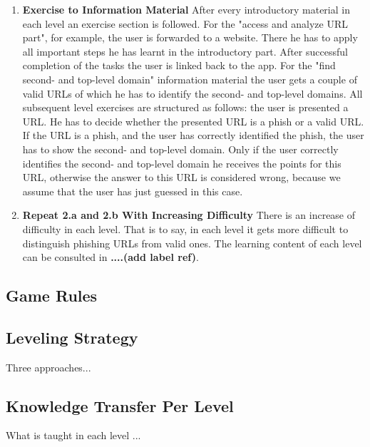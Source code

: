 \begin{enumerate}
\begin{enumerate}
		\item \textbf{Exercise to Information Material} After every introductory material in each level an exercise section is followed. For the "access and analyze URL part", for example, the user is forwarded to a website. There he has to apply all important steps he has learnt in the introductory part. After successful completion of the tasks the user is linked back to the app. For the "find second- and top-level domain" information material the user gets a couple of valid URLs of which he has to identify the second- and top-level domains. All subsequent level exercises are structured as follows: the user is presented a URL. He has to decide whether the presented URL is a phish or a valid URL. If the URL is a phish, and the user has correctly identified the phish, the user has to show the second- and top-level domain. Only if the user correctly identifies the second- and top-level domain he receives the points for this URL, otherwise the answer to this URL is considered wrong, because we assume that the user has just guessed in this case.
		\item \textbf{Repeat 2.a and 2.b With Increasing Difficulty} There is an increase of difficulty in each level. That is to say, in each level it gets more difficult to distinguish phishing URLs from valid ones. The learning content of each level can be consulted in \textbf{....(add label ref)}.
	\end{enumerate}
\end{enumerate}

\subsection{Game Rules}

\subsection{Leveling Strategy}
Three approaches...

\subsection{Knowledge Transfer Per Level}
What is taught in each level ... 

